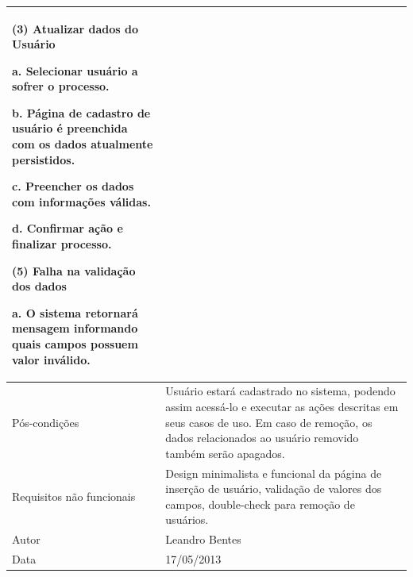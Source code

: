 \begin{flushleft}
\begin{supertabular}{|m{5.5680003cm}|m{9.325cm}|}
(3) Atualizar dados do Usuário

a. Selecionar usuário a sofrer o processo.

b. Página de cadastro de usuário é preenchida com os dados atualmente persistidos.

c. Preencher os dados com informações válidas.

d. Confirmar ação e finalizar processo.

(5) Falha na validação dos dados

a. O sistema retornará mensagem informando quais campos possuem valor inválido.
\\\hline
Pós-condições &
Usuário estará cadastrado no sistema, podendo assim acessá-lo e executar as ações descritas em seus casos de uso. Em caso de remoção, os dados relacionados ao usuário removido também serão apagados.\\\hline
Requisitos não funcionais &
Design minimalista e funcional da página de inserção de usuário, validação de valores dos campos, double-check para remoção de usuários.\\\hline
Autor &
Leandro Bentes\\\hline
Data &
17/05/2013\\\hline
\end{supertabular}
\end{flushleft}

